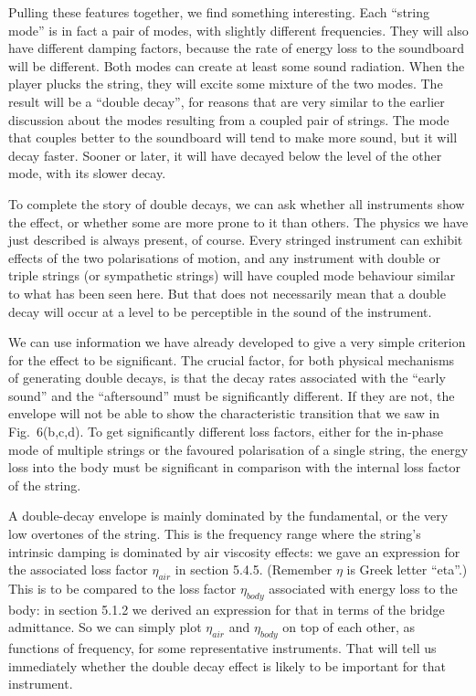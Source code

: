   Pulling these features together, we find something interesting. Each “string 
  mode” is in fact a pair of modes, with slightly different frequencies. They 
  will also have different damping factors, because the rate of energy loss to 
  the soundboard will be different. Both modes can create at least some sound 
  radiation. When the player plucks the string, they will excite some mixture 
  of the two modes. The result will be a “double decay”, for reasons that are 
  very similar to the earlier discussion about the modes resulting from a 
  coupled pair of strings. The mode that couples better to the soundboard will 
  tend to make more sound, but it will decay faster. Sooner or later, it will 
  have decayed below the level of the other mode, with its slower decay. 

  To complete the story of double decays, we can ask whether all instruments 
  show the effect, or whether some are more prone to it than others. The 
  physics we have just described is always present, of course. Every stringed 
  instrument can exhibit effects of the two polarisations of motion, and any 
  instrument with double or triple strings (or sympathetic strings) will have 
  coupled mode behaviour similar to what has been seen here. But that does not 
  necessarily mean that a double decay will occur at a level to be perceptible 
  in the sound of the instrument. 

  We can use information we have already developed to give a very simple 
  criterion for the effect to be significant. The crucial factor, for both 
  physical mechanisms of generating double decays, is that the decay rates 
  associated with the ``early sound'' and the ``aftersound'' must be 
  significantly different. If they are not, the envelope will not be able to 
  show the characteristic transition that we saw in Fig.\ 6(b,c,d). To get 
  significantly different loss factors, either for the in-phase mode of 
  multiple strings or the favoured polarisation of a single string, the energy 
  loss into the body must be significant in comparison with the internal loss 
  factor of the string. 

  A double-decay envelope is mainly dominated by the fundamental, or the very 
  low overtones of the string. This is the frequency range where the string’s 
  intrinsic damping is dominated by air viscosity effects: we gave an 
  expression for the associated loss factor $\eta_{air}$ in section 5.4.5. 
  (Remember $\eta$ is Greek letter ``eta''.) This is to be compared to the loss 
  factor $\eta_{body}$ associated with energy loss to the body: in section 
  5.1.2 we derived an expression for that in terms of the bridge admittance. So 
  we can simply plot $\eta_{air}$ and $\eta_{body}$ on top of each other, as 
  functions of frequency, for some representative instruments. That will tell 
  us immediately whether the double decay effect is likely to be important for 
  that instrument. 


